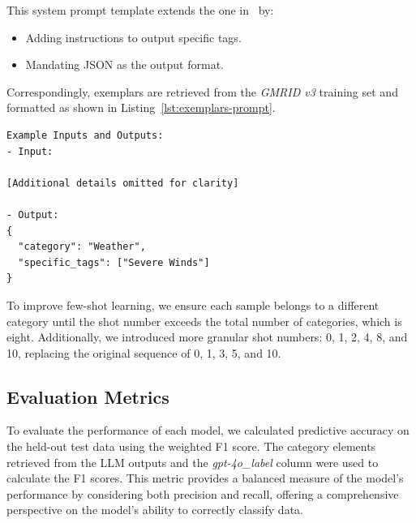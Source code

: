 \documentclass[conference]{IEEEtran}
\begin{document}
This system prompt template extends the one in~\cite{huang2024automating} by:
\begin{itemize}
    \item Adding instructions to output specific tags.
    \item Mandating JSON as the output format.
\end{itemize}
Correspondingly, exemplars are retrieved from the \textit{GMRID v3} training set and formatted as shown in Listing~\ref{lst:exemplars-prompt}.

\begin{lstlisting}[caption={Exemplars Used in Few-Shot Prompting}, 
                   label={lst:exemplars-prompt}, 
                   breaklines=true, 
                   basicstyle=\scriptsize\ttfamily, 
                   xleftmargin=0pt, 
                   framexleftmargin=0pt, 
                   framesep=0pt, 
                   aboveskip=0pt, 
                   belowskip=0pt, 
                   showspaces=false, 
                   showstringspaces=false,
                   keepspaces=true,
                   breakindent=0pt]
Example Inputs and Outputs:
- Input:

[Additional details omitted for clarity]

- Output:
{
  "category": "Weather",
  "specific_tags": ["Severe Winds"]
}
\end{lstlisting}

To improve few-shot learning, we ensure each sample belongs to a different category until the shot number exceeds the total number of categories, which is eight. Additionally, we introduced more granular shot numbers: 0, 1, 2, 4, 8, and 10, replacing the original sequence of 0, 1, 3, 5, and 10.

\subsection{Evaluation Metrics}

To evaluate the performance of each model, we calculated predictive accuracy on the held-out test data using the weighted F1 score. The category elements retrieved from the LLM outputs and the \textit{gpt-4o\_label} column were used to calculate the F1 scores. This metric provides a balanced measure of the model's performance by considering both precision and recall, offering a comprehensive perspective on the model's ability to correctly classify data.
\end{document}
